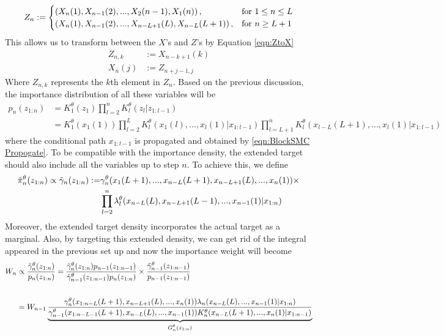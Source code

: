 \documentclass[12pt,a4paper]{article}
\begin{document}
\begin{equation*}
    Z_n := \begin{cases}
    \left(X_n(1),X_{n-1}(2),...,X_2(n-1),X_1(n)\right),& \textnormal{for}\ 1 \leq n \leq L \\
    \left(X_n(1),X_{n-1}(2),...,X_{n-L+1}(L),X_{n-L}(L+1)\right),& \textnormal{for}\ n \geq L+1
    \end{cases}
\end{equation*}
This allows us to transform between the $X$'s and $Z$'s by Equation \eqref{eqn:ZtoX}
\begin{align}
    \label{eqn:ZtoX}
    Z_{n,k} &:= X_{n-k+1}(k)\\
    X_n(j)  &:= Z_{n+j-1,j}
\end{align}
Where $Z_{n,k}$ represents the $k$th element in $Z_n$. Based on the previous discussion, the importance distribution of all these variables will be 
\begin{equation*}
    \begin{split}
        p_n(z_{1:n}) &= K_1^{\theta}(z_1)\prod_{l=2}^n K_l^{\theta}(z_l|z_{1:l-1})\\
        &=K_1^{\theta}(x_1(1))\prod_{l=2}^L K_l^{\theta}(x_1(l),...,x_l(1)|x_{1:l-1})\prod_{l=L+1}^n K_l^{\theta}(x_{l-L}(L+1),...,x_l(1)|x_{1:l-1})
    \end{split}
\end{equation*}
where the conditional path $x_{1:l-1}$ is propagated and obtained by \eqref{eqn:BlockSMC Propogate}. To be compatible with the importance density, the extended target should also include all the variables up to step $n$. To achieve this, we define
\begin{equation}
\label{eqn:BlockSMC_ExtendedTarget}
    \begin{split}
        \Tilde{\pi}_n^{\theta}(z_{1:n}) \propto \Tilde{\gamma}_n(z_{1:n}) :=& \gamma_n^{\theta}(x_1(L+1),...,x_{n-L}(L+1),x_{n-L+1}(L),...,x_n(1))\times\\
        &\prod_{l=2}^n \lambda_l^{\theta}(x_{n-L}(L),x_{n-L+1}(L-1),...,x_{n-1}(1)|x_{1:n})
    \end{split}
\end{equation}
Moreover, the extended target density incorporates the actual target as a marginal. Also, by targeting this extended density, we can get rid of the integral appeared in the previous set up and now the importance weight will become 
\begin{equation}
\label{eqn:BSMC_IncrementalWeight}
    \begin{split}
        W_n &\propto \frac{\Tilde{\gamma}^{\theta}_n(z_{1:n})}{p_n(z_{1:n})} = \frac{\Tilde{\gamma}^{\theta}_n(z_{1:n})p_{n-1}(z_{1:n-1})}{\Tilde{\gamma}^{\theta}_{n-1}(z_{1:n-1})p_n(z_{1:n})}\times \frac{\Tilde{\gamma}^{\theta}_{n-1}(z_{1:n-1})}{p_{n-1}(z_{1:n-1})}\\\\
        &=W_{n-1}\underbrace{\frac{\gamma_n^{\theta}(x_{1:n-L}(L+1),x_{n-L+1}(L),...,x_n(1))\lambda_n(x_{n-L}(L),...,x_{n-1}(1)|x_{1:n})}{\gamma_{n-1}^{\theta}(x_{1:n-L-1}(L+1),x_{n-L}(L),...,x_{n-1}(1))K_n^{\theta}(x_{n-L}(L+1),...,x_{n}(1)|x_{1:n-1})}}_\text{$G_n^{\theta}(z_{1:n})$}
    \end{split}
\end{equation}
\end{document}
